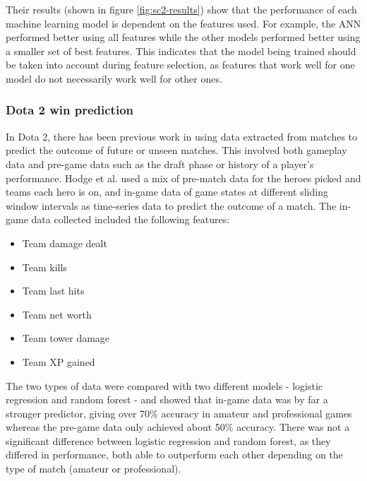 \documentclass[Report.tex]{subfiles}
\begin{document}
Their results (shown in figure \ref{fig:sc2-results}) show that the performance of each machine learning model is dependent on the features used. For example, the ANN performed better using all features while the other models performed better using a smaller set of best features. This indicates that the model being trained should be taken into account during feature selection, as features that work well for one model do not necessarily work well for other ones. 

\subsubsection{Dota 2 win prediction}
In Dota 2, there has been previous work in using data extracted from matches to predict the outcome of future or unseen matches. This involved both gameplay data and pre-game data such as the draft phase or history of a player's performance. Hodge et al. \cite{dota-mixed-rank-win} used a mix of pre-match data for the heroes picked and teams each hero is on, and in-game data of game states at different sliding window intervals as time-series data to predict the outcome of a match. The in-game data collected included the following features:
\begin{itemize}
\item Team damage dealt
\item Team kills
\item Team last hits
\item Team net worth
\item Team tower damage
\item Team XP gained
\end{itemize}
The two types of data were compared with two different models - logistic regression and random forest - and showed that in-game data was by far a stronger predictor, giving over 70\% accuracy in amateur and professional games whereas the pre-game data only achieved about 50\% accuracy. There was not a significant difference between logistic regression and random forest, as they differed in performance, both able to outperform each other depending on the type of match (amateur or professional). 
\end{document}
